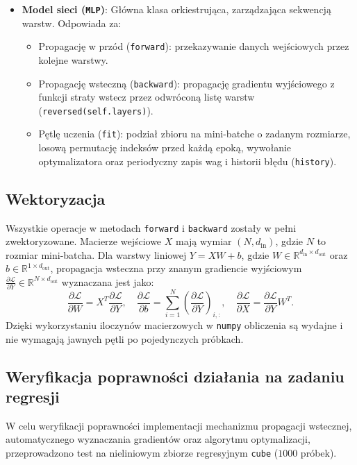 \documentclass[11pt,a4paper]{article}
\begin{document}
\begin{itemize}
    \item \textbf{Model sieci (\texttt{MLP})}:
    Główna klasa orkiestrująca, zarządzająca sekwencją warstw. Odpowiada za:
    \begin{itemize}
        \item Propagację w przód (\texttt{forward}): przekazywanie danych wejściowych przez kolejne warstwy.
        \item Propagację wsteczną (\texttt{backward}): propagację gradientu wyjściowego z funkcji straty wstecz przez odwróconą listę warstw (\texttt{reversed(self.layers)}).
        \item Pętlę uczenia (\texttt{fit}): podział zbioru na mini-batche o zadanym rozmiarze, losową permutację indeksów przed każdą epoką, wywołanie optymalizatora oraz periodyczny zapis wag i historii błędu (\texttt{history}).
    \end{itemize}
\end{itemize}

\subsection{Wektoryzacja}
Wszystkie operacje w metodach \texttt{forward} i \texttt{backward} zostały w pełni zwektoryzowane. Macierze wejściowe $X$ mają wymiar $(N, d_{\text{in}})$, gdzie $N$ to rozmiar mini-batcha. 
Dla warstwy liniowej $Y = XW + b$, gdzie $W \in \mathbb{R}^{d_{\text{in}} \times d_{\text{out}}}$ oraz $b \in \mathbb{R}^{1 \times d_{\text{out}}}$, propagacja wsteczna przy znanym gradiencie wyjściowym $\frac{\partial \mathcal{L}}{\partial Y} \in \mathbb{R}^{N \times d_{\text{out}}}$ wyznaczana jest jako:
\begin{equation}
    \frac{\partial \mathcal{L}}{\partial W} = X^T \frac{\partial \mathcal{L}}{\partial Y}, \quad 
    \frac{\partial \mathcal{L}}{\partial b} = \sum_{i=1}^N \left(\frac{\partial \mathcal{L}}{\partial Y}\right)_{i,:}, \quad 
    \frac{\partial \mathcal{L}}{\partial X} = \frac{\partial \mathcal{L}}{\partial Y} W^T.
\end{equation}
Dzięki wykorzystaniu iloczynów macierzowych w \texttt{numpy} obliczenia są wydajne i nie wymagają jawnych pętli po pojedynczych próbkach.

\subsection{Weryfikacja poprawności działania na zadaniu regresji}
W celu weryfikacji poprawności implementacji mechanizmu propagacji wstecznej, automatycznego wyznaczania gradientów oraz algorytmu optymalizacji, przeprowadzono test na nieliniowym zbiorze regresyjnym \texttt{cube} ($1000$ próbek).
\end{document}
